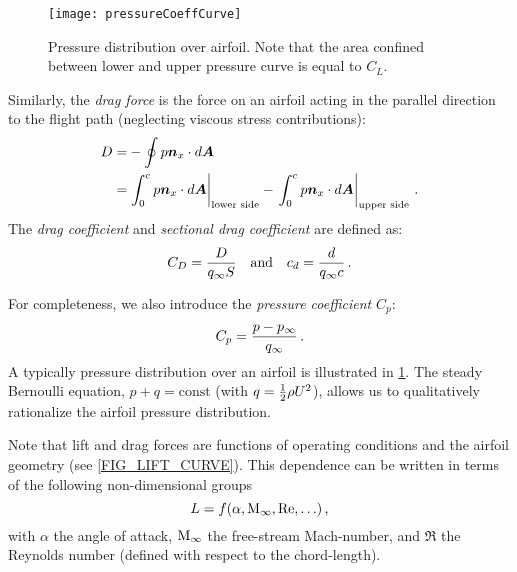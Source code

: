 \begin{figure}[!b!]
  \begin{center}
    \texttt{[image: pressureCoeffCurve]}
    \caption{\label{FIG_PRESSURE_DISTRIBUTION}Pressure distribution over airfoil. Note that the area confined between lower and upper pressure curve is equal to $C_L$.}
  \end{center}
\end{figure}

Similarly, the {\it drag force} is the force on an airfoil acting in the parallel direction to the flight path (neglecting viscous stress contributions):
\begin{equation}
  \begin{split}
    D =& - \oint p{\mbox{\boldmath$n$}}_x\cdot d {\mbox{\boldmath$A$}}\\
       =& \left.\int^c_0 p {\mbox{\boldmath$n$}}_x\cdot d {\mbox{\boldmath$A$}}\right|_\text{lower side} - \left.\int^c_0 p {\mbox{\boldmath$n$}}_x\cdot d {\mbox{\boldmath$A$}}\right|_\text{upper side} \, \text{.}
  \end{split}
\end{equation}
The {\it{drag coefficient}} and {\it sectional drag coefficient} are defined as:
\begin{equation}
  C_D = {\frac{D}{q_\infty S}} \quad \text{and} \quad c_d = {\frac{d}{q_\infty c}} \,.
\end{equation}

For completeness, we also introduce the {\it pressure coefficient} $C_p$: 
\begin{equation}
  \label{EQ_CP_CURVE}
  C_p = {\frac{p-p_\infty}{q_\infty}} \,.
\end{equation}
A typically pressure distribution over an airfoil is illustrated in \cref{FIG_PRESSURE_DISTRIBUTION}. The steady Bernoulli equation, $p+q=\text{const}$ (with $q={\frac{1}{2}}\rho U^2$), allows us to qualitatively rationalize the airfoil pressure distribution.

Note that lift and drag forces are functions of operating conditions and the airfoil geometry (see \cref{FIG_LIFT_CURVE}). This dependence can be written in terms of the following non-dimensional groups
\begin{equation}
  L = f(\alpha, {\rm{M}}_{\infty}, {\rm{Re}}, \ldots) \, \text{,}
\end{equation}
with $\alpha$ the angle of attack, ${\rm{M}}_\infty$ the free-stream Mach-number, and $\Re$ the Reynolds number (defined with respect to the chord-length).

